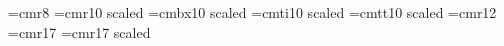 









 





\enablehyperlinks[dvipdfm]

\font\small=cmr8
\font\medium=cmr10 scaled \magstephalf
\font\mediumbx=cmbx10 scaled \magstephalf
\font\mediumit=cmti10 scaled \magstephalf
\font\mediumtt=cmtt10 scaled \magstephalf
\font\large=cmr12
\font\Large=cmr17
\font\huge=cmr17 scaled 

